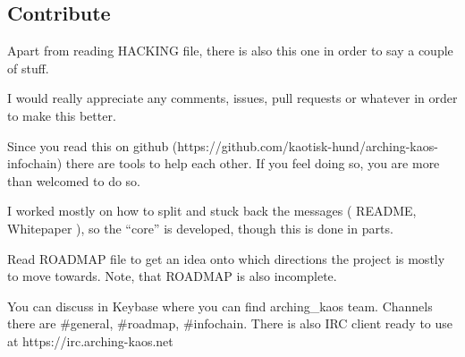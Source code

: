\hypertarget{contribute}{%
\subsection{Contribute}\label{contribute}}

Apart from reading HACKING file, there is also this one in order to say
a couple of stuff.

I would really appreciate any comments, issues, pull requests or
whatever in order to make this better.

Since you read this on github
(https://github.com/kaotisk-hund/arching-kaos-infochain) there are tools
to help each other. If you feel doing so, you are more than welcomed to
do so.

I worked mostly on how to split and stuck back the messages ( README,
Whitepaper ), so the ``core'' is developed, though this is done in
parts.

Read ROADMAP file to get an idea onto which directions the project is
mostly to move towards. Note, that ROADMAP is also incomplete.

You can discuss in Keybase where you can find arching\_kaos team.
Channels there are \#general, \#roadmap, \#infochain. There is also IRC
client ready to use at https://irc.arching-kaos.net
